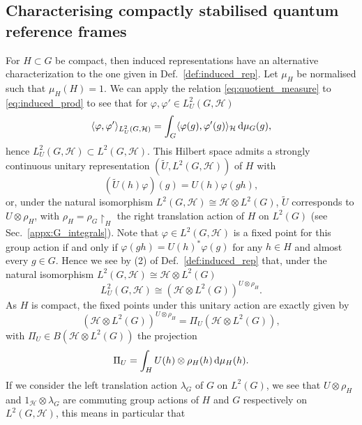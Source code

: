 \documentclass[sn-mathphys-num]{sn-jnl}%
\newcommand{\HH}{\mathcal{H}}
\newcommand{\diff}{\textup{d}}
\numberwithin{equation}{section}
\theoremstyle{thmstyleone}%
\theoremstyle{thmstyletwo}%
\theoremstyle{thmstylethree}%
\begin{document}
\subsection{Characterising compactly stabilised quantum reference frames}
\label{appx:compact_stab_qrf_charact}
For $H\subset G$ be compact, then induced representations have an alternative characterization to the one given in Def.\ \ref{def:induced_rep}. Let $\mu_H$ be normalised such that $\mu_H(H)=1$. We can apply the relation \eqref{eq:quotient_measure} to \eqref{eq:induced_prod} to see that for $\varphi,\varphi'\in L^2_U(G,\HH)$
    \begin{equation}
        \langle\varphi,\varphi'\rangle_{L^2_U(G,\HH)}=\int_G\langle\varphi(g),\varphi'(g)\rangle_\HH\,\diff\mu_G(g),
    \end{equation}
    hence $L^2_U(G,\HH)\subset L^2(G,\HH)$. This Hilbert space admits a strongly continuous unitary representation $(\tilde{U},L^2(G,\HH))$ of $H$ with 
    \begin{equation}
        (\tilde{U}(h)\varphi)(g)=U(h)\varphi(gh),
    \end{equation}
    or, under the natural isomorphism $L^2(G,\HH)\cong \HH\otimes L^2(G)$, $\tilde{U}$ corresponds to $U\otimes\rho_H$, with $\rho_H=\rho_G\restriction_H$ the right translation action of $H$ on $L^2(G)$ (see Sec.\ \ref{appx:G_integrals}). Note that $\varphi\in L^2(G,\HH)$ is a fixed point for this group action if and only if $\varphi(gh)=U(h)^*\varphi(g)$ for any $h\in H$ and almost every $g\in G$. Hence we see by (2) of Def.~\ref{def:induced_rep} that, under the natural isomorphism $L^2(G,\HH)\cong \HH\otimes L^2(G)$ 
    \begin{equation}
        L^2_U(G,\HH)\cong (\HH\otimes L^2(G))^{U\otimes \rho_H}.
    \end{equation}
    As $H$ is compact, the fixed points under this unitary action are exactly given by 
    \begin{equation}
        (\HH\otimes L^2(G))^{U\otimes \rho_H}=\Pi_{U}(\HH\otimes L^2(G)),
    \end{equation} with $\Pi_{U}\in B(\HH\otimes L^2(G))$ the projection
    \begin{equation}
    \label{eq:average_proj}
        \Pi_{U}=\int_HU(h)\otimes\rho_H(h)\,\diff\mu_H(h).
    \end{equation}
    If we consider the left translation action $\lambda_G$ of $G$ on $L^2(G)$, we see that $U\otimes\rho_H$ and $1_\HH\otimes\lambda_G$ are commuting group actions of $H$ and $G$ respectively on $L^2(G,\HH)$, this means in particular that
\end{document}
